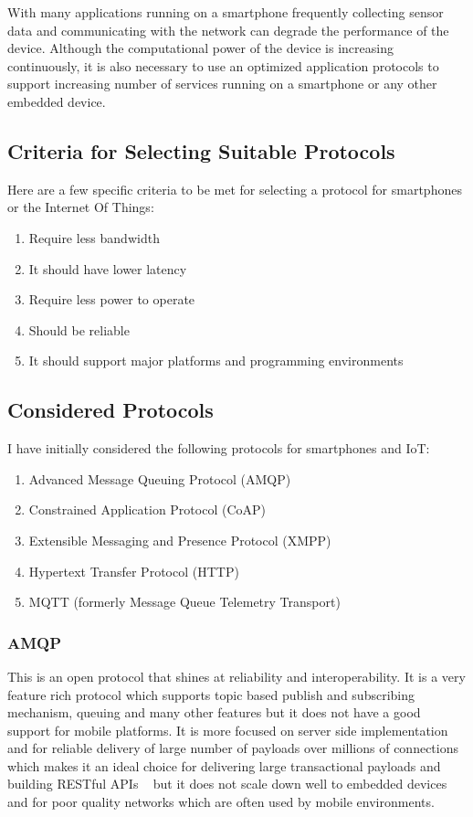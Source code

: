 \documentclass[conference]{IEEEtran}
\begin{document}
With many applications running on a smartphone frequently collecting sensor data and communicating with the network can degrade the performance of the device. Although the computational power of the device is increasing continuously, it is also necessary to use an optimized application protocols to support increasing number of services running on a smartphone or any other embedded device. 

\subsection{Criteria for Selecting Suitable Protocols}
Here are a few specific criteria to be met for selecting a protocol for smartphones or the Internet Of Things:
\begin{enumerate}
  \item Require less bandwidth
  \item It should have lower latency
  \item Require less power to operate
  \item Should be reliable
  \item It should support major platforms and programming environments
\end{enumerate}

\subsection{Considered Protocols}
I have initially considered the following protocols for smartphones and IoT:
\begin{enumerate}
  \item Advanced Message Queuing Protocol (AMQP)
  \item Constrained Application Protocol (CoAP)
  \item Extensible Messaging and Presence Protocol (XMPP)
  \item Hypertext Transfer Protocol (HTTP)
  \item MQTT (formerly Message Queue Telemetry Transport)
\end{enumerate}

\subsubsection{AMQP}
This is an open protocol that shines at reliability and interoperability. It is a very feature rich protocol  which supports topic based publish and subscribing mechanism, queuing and many other features but it does not have a good support for mobile platforms. It is more focused on server side implementation~\cite{amqp-vinoski} and for reliable delivery of large number of payloads over millions of connections which makes it an ideal choice for delivering large transactional payloads and building RESTful APIs ~\cite{amqp-restfulapi} but it does not scale down well to embedded devices and for poor quality networks which are often used by mobile environments. ~\cite{amqp1}
\end{document}
